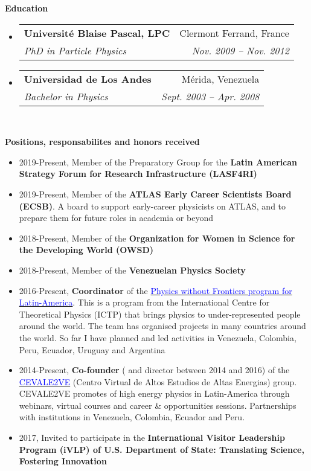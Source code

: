 \documentclass[letterpaper,10pt]{article}
\makeatletter
\newcommand{\resheading}[1]{{\large \colorbox{mygrey}{\begin{minipage}{\textwidth}{\textbf{#1 \vphantom{p\^{E}}}}\end{minipage}}}}
\newcommand{\ressubheading}[4]{
\begin{tabular*}{6.5in}{l@{\extracolsep{\fill}}r}
		\textbf{#1} & #2 \\
		\textit{#3} & \textit{#4} \\
\end{tabular*}\vspace{-6pt}}
\makeatother
\begin{document}
\noindent
\resheading{Education}
	\begin{itemize}
		\item
			\ressubheading{Universit{\'e} Blaise Pascal, LPC}{Clermont Ferrand, France}{PhD in Particle Physics}{Nov. 2009 --  Nov. 2012}
		\item 	
			\ressubheading{Universidad de Los Andes}{M\'erida, Venezuela}{Bachelor in Physics}{Sept. 2003 --  Apr. 2008}\\

	\end{itemize} %

\noindent
\resheading{Positions, responsabilites and honors received}
	\begin{itemize}
		\item 2019-Present, Member of the Preparatory Group for the \textbf{Latin American Strategy Forum for Research Infrastructure (LASF4RI)}
		\item 2019-Present, Member of the \textbf{ATLAS Early Career Scientists Board (ECSB)}. A board to support early-career physicists on ATLAS, and to prepare them for future roles in academia or beyond
		\item 2018-Present, Member of the \textbf{Organization for Women in Science for the Developing World (OWSD)}
		\item 2018-Present, Member of the \textbf{Venezuelan Physics Society}
	        \item 2016-Present, \textbf{Coordinator} of the \href{https://www.ictp.it/physics-without-frontiers/current-country-projects/venezuela-and-colombia.aspx}{\textcolor{blue}{Physics without Frontiers program for Latin-America}}. This is a program from the International Centre for Theoretical Physics (ICTP) that brings physics to under-represented people around the world. The team has organised projects in many countries around the world. So far I have planned and led activities in Venezuela, Colombia, Peru, Ecuador, Uruguay and Argentina
		\item 2014-Present, \textbf{Co-founder} ( and director between 2014 and 2016) of the \href{http://www.cevale2ve.org}{\textcolor{blue}{CEVALE2VE}} (Centro Virtual de Altos Estudios de Altas Energias) group. CEVALE2VE promotes of high energy physics in Latin-America through webinars, virtual courses and career \& opportunities sessions. Partnerships with institutions in Venezuela, Colombia, Ecuador and Peru.
		\item 2017, Invited to participate in the \textbf{International Visitor Leadership Program (iVLP) of U.S. Department of State: Translating Science, Fostering Innovation}

\end{itemize}
\end{document}
